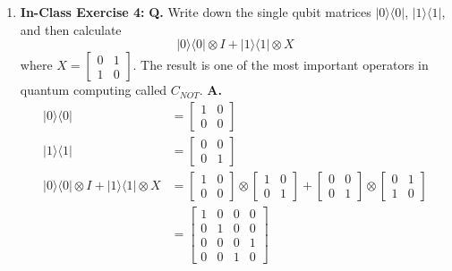 \documentclass[main.tex]{subfiles}
\begin{document}
\begin{enumerate}
\item[] \textbf{In-Class Exercise 4:} \textbf{Q.} Write down the single qubit matrices $|0\rangle\langle 0|$, $|1\rangle\langle1|$, and then calculate
$$|0\rangle\langle 0|\otimes I+| 1\rangle\langle 1| \otimes X$$
where $X=\left[\begin{array}{ll}0 & 1 \\ 1 & 0\end{array}\right]$. The result is one of the most important operators in quantum computing called $C_{NOT}$. \textbf{A.}
    \begin{align*}
        |0\rangle\langle 0|             & = \left[\begin{array}{ll} 1 & 0 \\ 0 & 0 \end{array}\right] \\
        |1\rangle\langle 1|             & = \left[\begin{array}{ll} 0 & 0 \\ 0 & 1 \end{array}\right] \\
        |0\rangle\langle 0|\otimes I 
        + |1\rangle\langle1|\otimes X   & = \left[\begin{array}{ll} 1 & 0 \\ 0 & 0 \end{array}\right]
                                        \otimes \left[\begin{array}{ll}1 & 0 \\ 0 & 1\end{array}\right]
                                        + \left[\begin{array}{ll} 0 & 0 \\ 0 & 1 \end{array}\right]
                                        \otimes \left[\begin{array}{ll}0 & 1 \\ 1 & 0\end{array}\right]\\
                                        & = \left[\begin{array}{llll}1&0&0&0\\0&1&0&0\\0&0&0&1\\0&0&1&0\end{array}\right]
    \end{align*}


\end{enumerate}
\end{document}
